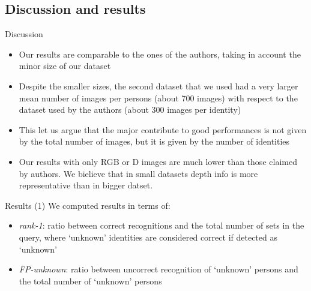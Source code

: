 \documentclass{beamer}
\begin{document}
\subsection{Discussion and results}
\begin{frame}{Discussion}
	\begin{itemize}
		\item Our results are comparable to the ones of the authors,
			taking in account the minor size of our dataset
		\item Despite the smaller sizes, the second dataset that we
			used had a very larger mean number of images per
			persons (about 700 images) with respect to the dataset
			used by the authors (about 300 images per identity)
		\item This let us argue that the major contribute to good
			performances is not given by the total number of images,
			but it is given by the number of identities
		\item Our results with only RGB or D images are much lower than
			those claimed by authors. We bielieve that in small
			datasets depth info is more representative than in
			bigger datset.
	\end{itemize}
\end{frame}

\begin{frame}{Results (1)}
	We computed results in terms of:
	\begin{itemize}
		\item \textit{rank-1}: ratio between correct recognitions and
			the total number of sets in the query, where `unknown'
			identities are considered correct if detected as
			`unknown'
		\item \textit{FP-unknown}: ratio between uncorrect recognition
			of `unknown' persons and the total number of `unknown'
			persons
	\end{itemize}
\end{frame}
\end{document}
